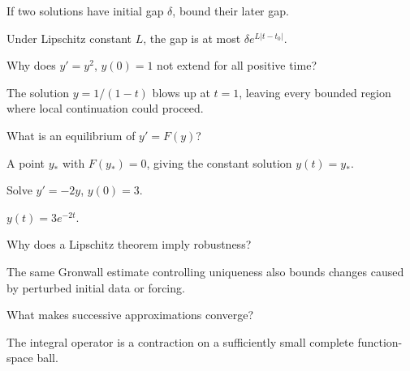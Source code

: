 \begin{problem}\label{prob:ii19-problem-06}
If two solutions have initial gap $\delta$, bound their later gap.
\end{problem}
\begin{solution}
Under Lipschitz constant $L$, the gap is at most $\delta e^{L|t-t_0|}$.
\end{solution}

\begin{problem}\label{prob:ii19-problem-07}
Why does $y'=y^2$, $y(0)=1$ not extend for all positive time?
\end{problem}
\begin{solution}
The solution $y=1/(1-t)$ blows up at $t=1$, leaving every bounded region where local continuation could proceed.
\end{solution}

\begin{problem}\label{prob:ii19-problem-08}
What is an equilibrium of $y'=F(y)$?
\end{problem}
\begin{solution}
A point $y_*$ with $F(y_*)=0$, giving the constant solution $y(t)=y_*$.
\end{solution}

\begin{problem}\label{prob:ii19-problem-09}
Solve $y'=-2y$, $y(0)=3$.
\end{problem}
\begin{solution}
$y(t)=3e^{-2t}$.
\end{solution}

\begin{problem}\label{prob:ii19-problem-10}
Why does a Lipschitz theorem imply robustness?
\end{problem}
\begin{solution}
The same Gronwall estimate controlling uniqueness also bounds changes caused by perturbed initial data or forcing.
\end{solution}

\begin{problem}\label{prob:ii19-problem-11}
What makes successive approximations converge?
\end{problem}
\begin{solution}
The integral operator is a contraction on a sufficiently small complete function-space ball.
\end{solution}

